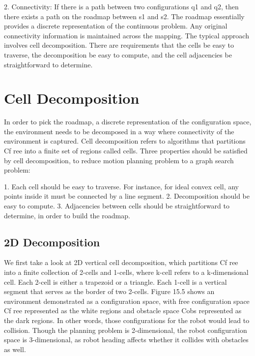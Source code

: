 \documentclass[twoside]{article}
\begin{document}
2. Connectivity: If there is a path between two configurations q1 and q2, then there exists a path on the roadmap between s1 and s2.
The roadmap essentially provides a discrete representation of the continuous problem. Any original connectivity information is maintained across the mapping.
The typical approach involves cell decomposition. There are requirements that the cells be easy to traverse, the decomposition be easy to compute, and the cell adjacencies be straightforward to determine.

\section{Cell Decomposition}
In order to pick the roadmap, a discrete representation of the configuration space, the environment needs to be decomposed in a way where connectivity of the environment is captured. Cell decomposition refers to algorithms that partitions Cf ree into a finite set of regions called cells. Three properties should be satisfied by cell decomposition, to reduce motion planning problem to a graph search problem:

1. Each cell should be easy to traverse. For instance, for ideal convex cell, any points inside it must be connected by a line segment.
2. Decomposition should be easy to compute.
3. Adjacencies between cells should be straightforward to determine, in order to build the roadmap.

\subsection{2D Decomposition}
We first take a look at 2D vertical cell decomposition, which partitions Cf ree into a finite collection of 2-cells and 1-cells, where k-cell refers to a k-dimensional cell. Each 2-cell is either a trapezoid or a triangle.
Each 1-cell is a vertical segment that serves as the border of two 2-cells. Figure 15.5 shows an environment demonstrated as a configuration space, with free configuration space Cf ree represented as the white regions and obstacle space Cobs represented as the dark regions. In other words, those configurations for the robot would lead to collision. Though the planning problem is 2-dimensional, the robot configuration space is 3-dimensional, as robot heading affects whether it collides with obstacles as well.
\end{document}
